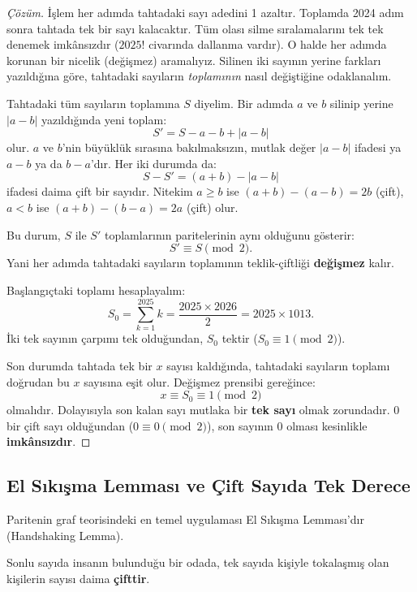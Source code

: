 \begin{proof}[Çözüm]
İşlem her adımda tahtadaki sayı adedini 1 azaltır. Toplamda 2024 adım sonra tahtada tek bir sayı kalacaktır. Tüm olası silme sıralamalarını tek tek denemek imkânsızdır ($2025!$ civarında dallanma vardır). O halde her adımda korunan bir nicelik (değişmez) aramalıyız. Silinen iki sayının yerine farkları yazıldığına göre, tahtadaki sayıların \emph{toplamının} nasıl değiştiğine odaklanalım.

Tahtadaki tüm sayıların toplamına $S$ diyelim. Bir adımda $a$ ve $b$ silinip yerine $|a - b|$ yazıldığında yeni toplam:
\[
S' = S - a - b + |a - b|
\]
olur. $a$ ve $b$'nin büyüklük sırasına bakılmaksızın, mutlak değer $|a - b|$ ifadesi ya $a - b$ ya da $b - a$'dır. Her iki durumda da:
\[
S - S' = (a + b) - |a - b|
\]
ifadesi daima çift bir sayıdır. Nitekim $a \ge b$ ise $(a + b) - (a - b) = 2b$ (çift), $a < b$ ise $(a + b) - (b - a) = 2a$ (çift) olur. 

Bu durum, $S$ ile $S'$ toplamlarının paritelerinin aynı olduğunu gösterir:
\[
S' \equiv S \pmod 2.
\]
Yani her adımda tahtadaki sayıların toplamının teklik-çiftliği \textbf{değişmez} kalır.

Başlangıçtaki toplamı hesaplayalım:
\[
S_0 = \sum_{k=1}^{2025} k = \frac{2025 \times 2026}{2} = 2025 \times 1013.
\]
İki tek sayının çarpımı tek olduğundan, $S_0$ tektir ($S_0 \equiv 1 \pmod 2$).

Son durumda tahtada tek bir $x$ sayısı kaldığında, tahtadaki sayıların toplamı doğrudan bu $x$ sayısına eşit olur. Değişmez prensibi gereğince:
\[
x \equiv S_0 \equiv 1 \pmod 2
\]
olmalıdır. Dolayısıyla son kalan sayı mutlaka bir \textbf{tek sayı} olmak zorundadır. $0$ bir çift sayı olduğundan ($0 \equiv 0 \pmod 2$), son sayının $0$ olması kesinlikle \textbf{imkânsızdır}.
\end{proof}

\subsection{El Sıkışma Lemması ve Çift Sayıda Tek Derece}

Paritenin graf teorisindeki en temel uygulaması El Sıkışma Lemması'dır (Handshaking Lemma).

\begin{theorem}
Sonlu sayıda insanın bulunduğu bir odada, tek sayıda kişiyle tokalaşmış olan kişilerin sayısı daima \textbf{çifttir}.
\end{theorem}


